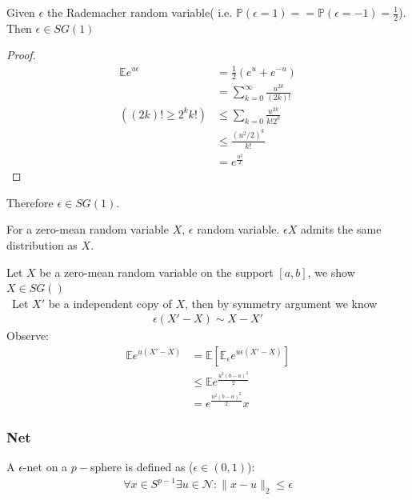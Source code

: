 \begin{example}
Given $\epsilon$ the Rademacher random variable( i.e. $\mathbb{P}(\epsilon = 1) = =\mathbb{P}(\epsilon = -1) = \frac{1}{2}$). Then $\epsilon \in SG(1)$
\begin{proof}
	\begin{align*}
		\mathbb{E} e^{u \epsilon} &= \frac{1}{2} (e^u + e^{-u})\\
		&= \sum_{k = 0}^\infty \frac{u^{2k}}{(2k)!}\\
((2k)! \geq 2^k k!)
 		&\leq \sum_{k =0} \frac{u^{2k}}{k!2^k}\\
 		&\leq \frac{(u^2\slash 2)^k}{k!}\\
 		& = e^{\frac{u^2}{2}}
	\end{align*}
\end{proof}
Therefore $\epsilon \in SG(1)$.
\end{example}
\begin{remark}
For a zero-mean random variable $X$, $\epsilon$ random variable. $\epsilon X$ admits the same distribution as $X$.	
\end{remark}

\begin{example}
	Let $X$ be a zero-mean random variable on the support $[a, b]$, we show $X \in SG()$\\\
	Let $X'$ be a independent copy of $X$, then by symmetry argument we know 
	\begin{align*}
		\epsilon(X' - X) \sim X - X'
	\end{align*} 
	Observe:
	\begin{align*}
		\mathbb{E}e^{u(X'- X)} &= \mathbb{E}[ \mathbb{E}_\epsilon e^{u\epsilon(X'-X)}]\\
		&\leq \mathbb{E} e^{\frac{u^2(b-a)^2}{2}}\\
		&= e^{\frac{u^2(b-a)^2}{2}}x
	\end{align*}
\end{example}


\subsubsection{Net}
\begin{definition}
	A $\epsilon$-net on a $p-$sphere is defined as ($\epsilon \in(0, 1)$):
	\begin{align*}
		\forall x \in S^{p-1} \exists u \in \mathcal{N}: \|x - u\|_2 \leq \epsilon
	\end{align*}
\end{definition}

